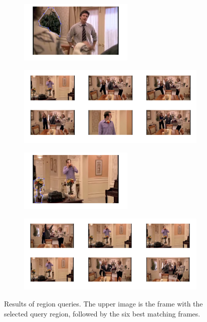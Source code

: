 \documentclass{paper}
\begin{document}
\begin{figure}[h!]
    \centering
    \begin{subfigure}[]{\textwidth}
        \centering
        \includegraphics[width=0.6\textwidth]{regionQuery3sel.png}
    \end{subfigure}
    \begin{subfigure}[]{\textwidth}
        \centering
        \includegraphics[width=\textwidth]{regionQuery3res.png}
    \end{subfigure}
    \begin{subfigure}[]{\textwidth}
        \centering
        \includegraphics[width=0.6\textwidth]{regionQuery4sel.png}
    \end{subfigure}
    \begin{subfigure}[]{\textwidth}
        \centering
        \includegraphics[width=\textwidth]{regionQuery4res.png}
    \end{subfigure}
    \caption{Results of region queries. The upper image is the frame with the selected query region, followed by the six best matching frames. }
\label{fig:regMatch2}
\end{figure}
\end{document}
